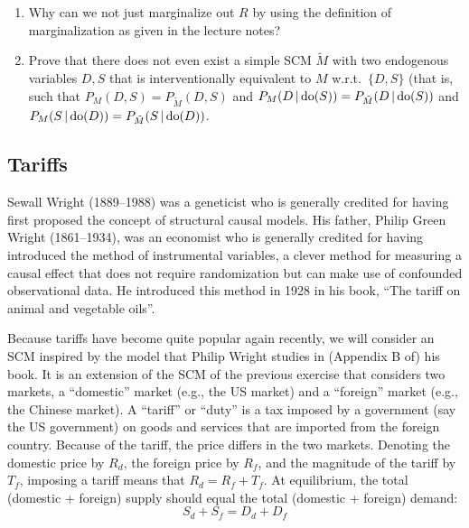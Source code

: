 \begin{enumerate}[resume*]
  \item Why can we not just marginalize out $R$ by using the definition of marginalization as given in the lecture notes?
  \item 
    Prove that there does not even exist a simple SCM $\tilde{M}$ with two endogenous variables $D,S$ that is interventionally equivalent to $M$ w.r.t.\ $\{D,S\}$
    (that is, such that $P_M(D,S) = P_{\tilde{M}}(D,S)$ and $P_M(D \operatorname*{|} \operatorname{do}(S)) = P_{\tilde{M}}(D \operatorname*{|} \operatorname{do}(S))$ and $P_M(S \operatorname*{|} \operatorname{do}(D)) = P_{\tilde{M}}(S \operatorname*{|} \operatorname{do}(D))$.
\end{enumerate}

\subsection{Tariffs}
Sewall Wright (1889--1988) was a geneticist who is generally credited for having first proposed the concept of structural causal models.
His father, Philip Green Wright (1861--1934), was an economist who is generally credited for having introduced the method of instrumental variables, a clever method for measuring
a causal effect that does not require randomization but can make use of confounded observational data. He introduced this method in 1928 in his book, ``The tariff on animal and vegetable oils''.

Because tariffs have become quite popular again recently, we will consider an SCM inspired by the model that Philip Wright studies in (Appendix B of) his book.
It is an extension of the SCM of the previous exercise that considers two markets, a ``domestic'' market (e.g., the US market) and a ``foreign'' market (e.g., the Chinese market).
A ``tariff'' or ``duty'' is a tax imposed by a government (say the US government) on goods and services that are imported from the foreign country.
Because of the tariff, the price differs in the two markets.
Denoting the domestic price by $R_d$, the foreign price by $R_f$, and the magnitude of the tariff by $T_f$, imposing a tariff means that
$R_d = R_f + T_f$.
At equilibrium, the total (domestic + foreign) supply should equal the total (domestic + foreign) demand:
$$S_d + S_f = D_d + D_f$$

